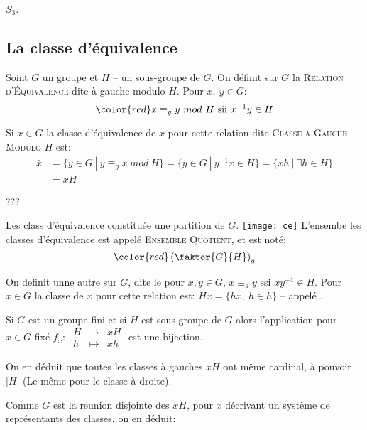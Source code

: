 \begin{examplebox}
	$S_3$.
\end{examplebox}

\subsection{La classe d'équivalence} 

\begin{definition}
	Soint $G$ un groupe et $H$ -- un sous-groupe de $G$. On définit sur $G$ la \textsc{Relation d'Équivalence} dite à gauche modulo $H$. Pour $x,\ y\in G$: 
	\[ \color{red} x\equiv_g y\ mod\ H \mbox{ sii } x^{-1}y\in H \]
	\vspace{-8mm}
\end{definition}

Si $x\in G$ la classe d'équivalence de $x$ pour cette relation dite \textsc{Classe à Gauche Modulo $H$} est:
\begin{align*}	
	\bar{x} & =\{y\in G\ |\ y\equiv_g x\  mod\ H\}=\{y\in G\ |\ y^{-1}x\in H\}=\{xh\ |\ \exists h\in H\}\\
	& =xH
\end{align*} 

	???

\begin{remark}
	Les class d'équivalence constituée une \underline{partition} de $G$.
	\texttt{[image: ce]}
	L'ensembe les classes d'équivalence est appelé \textsc{Ensemble Quotient}, et est noté:
	$$ \color{red}\left(	\faktor{G}{H}	\right)_g$$
\end{remark}

On definit unne autre  sur $G$, dite  le pour $x, y\in G$, $x\equiv_dy$ ssi $xy^{-1}\in H$. Pour $x\in G$ la classe de $x$ pour cette relation est: $Hx=\{hx,\ h\in h\}$ -- appelé .

Si $G$ est un groupe fini et si $H$ est sous-groupe de $G$ alors l'application pour $x\in G$ fixé $f_x:\ \begin{array}{rcl}H &\rightarrow & xH\\ h &\mapsto & xh\end{array}$ est une bijection.

On en déduit que toutes les classes à gauches $xH$ ont même cardinal, à pouvoir $|H|$ (Le même pour le classe à droite).

Comme $G$ est la reunion disjointe des $xH$, pour $x$ décrivant un système de représentants des classes, on en déduit:

